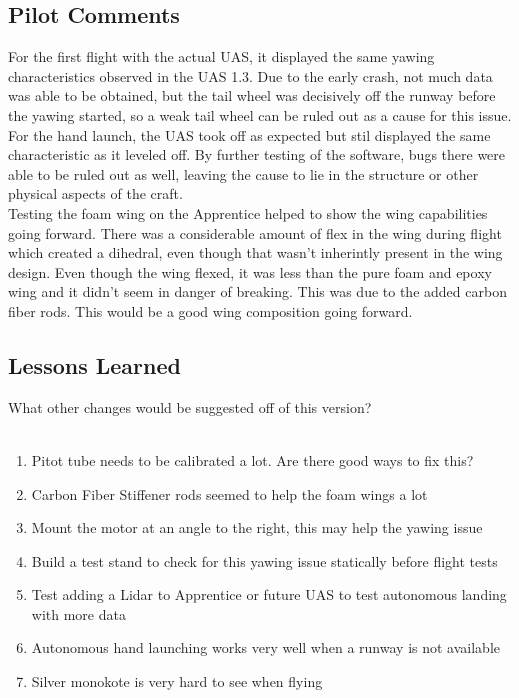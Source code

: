\documentclass{article}
\begin{document}
\subsection*{Pilot Comments}
For the first flight with the actual UAS, it displayed the same yawing characteristics observed in the UAS 1.3. Due to the early crash, not much data was able to be obtained, but the tail wheel was decisively off the runway before the yawing started, so a weak tail wheel can be ruled out as a cause for this issue. For the hand launch, the UAS took off as expected but stil displayed the same characteristic as it leveled off. By further testing of the software, bugs there were able to be ruled out as well, leaving the cause to lie in the structure or other physical aspects of the craft. \\
Testing the foam wing on the Apprentice helped to show the wing capabilities going forward. There was a considerable amount of flex in the wing during flight which created a dihedral, even though that wasn't inherintly present in the wing design. Even though the wing flexed, it was less than the pure foam and epoxy wing and it didn't seem in danger of breaking. This was due to the added carbon fiber rods. This would be a good wing composition going forward.

\subsection*{Lessons Learned}
What other changes would be suggested off of this version? \\ \\
\begin{enumerate}
	\item Pitot tube needs to be calibrated a lot. Are there good ways to fix this?
	\item Carbon Fiber Stiffener rods seemed to help the foam wings a lot
	\item Mount the motor at an angle to the right, this may help the yawing issue
	\item Build a test stand to check for this yawing issue statically before flight tests
	\item Test adding a Lidar to Apprentice or future UAS to test autonomous landing with more data
	\item Autonomous hand launching works very well when a runway is not available
	\item Silver monokote is very hard to see when flying
\end{enumerate} 
\end{document}

